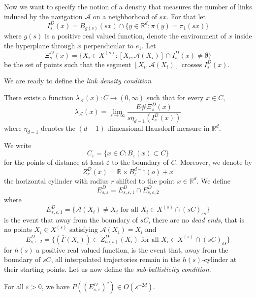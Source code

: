 Now we want to specify the notion of a density that measures the number of links induced by the navigation $\mathcal{A}$ on a neighborhood of $sx$. For that let
$$I_s^D(x)=B_{g(s)}(sx)\cap\lbrace y\in\mathbb{R}^d:\pi(y)=\pi_1(sx)\rbrace $$ where $g(s)$ is a positive real valued function, denote the environment of $x$ inside the hyperplane through $x$ perpendicular to $e_1$. Let
$$\Xi_s^D(x)=\lbrace X_i\in X^{(s)}:[X_i,\mathcal{A}(X_i)]\cap I_s^D(x)\neq \emptyset\rbrace $$ be the set of points such that the segment $[X_i,\mathcal{A}(X_i)]$ crosses $I_s^D(x)$.
 
We are ready to define the \textit{link density condition}
 \begin{con}\label{con1} There exists a function $\lambda_\mathcal{A}(x):C\rightarrow(0,\infty)$ such that for every $x\in C$,
 $$\lambda_\mathcal{A}(x)=\lim_{s\rightarrow\infty}\frac{E\#\Xi_s^D(x) }{s\eta_{d-1}(I_s^D(x))}$$ where $\eta_{d-1}$ denotes the $(d-1)$-dimensional Hausdorff measure in $\mathbb{R}^d$.
 \end{con}
 
We write
 $$C_\varepsilon=\lbrace x\in C: B_\varepsilon(x)\subset C\rbrace $$ for the points of distance at least $\varepsilon$ to the boundary of $C$. Moreover, we denote by $$Z_r^D(x)=\mathbb{R}\times B_r^{d-1}(o)+x$$ the horizontal cylinder with radius $r$ shifted to the point $x\in\mathbb{R}^d$. We define $$E^D_{s,\varepsilon}=E^D_{s,\varepsilon,1}\cap E^D_{s,\varepsilon,2}$$ where $$E^D_{s,\varepsilon,1}=\lbrace\mathcal{A}(X_i)\neq X_i\mbox{ for all }X_i \in X^{(s)}\cap(sC)_{\varepsilon s}\rbrace$$ is the event that away from the boundary of $sC$, there are no \textit{dead ends}, that is no points $X_i\in X^{(s)}$ satisfying $\mathcal{A}(X_i)=X_i$ and $$E^D_{s,\varepsilon,2}=\lbrace(\bar{\Gamma}(X_i))\subset Z_{h(s)}^D(X_i)\mbox{ for all }X_i \in X^{(s)}\cap(sC)_{\varepsilon s}\rbrace $$ for $h(s)$ a positive real valued function, is the event that, away from the boundary of $sC$, all interpolated trajectories remain in the $h(s)$-cylinder at their starting points.  Let us now define the \textit{sub-ballisticity condition}.
 
 
\begin{con}\label{con2} For all $\varepsilon >0$, we have $P((E_{s,\varepsilon}^D)^c)\in O(s^{-2d})$.
\end{con} 
 
